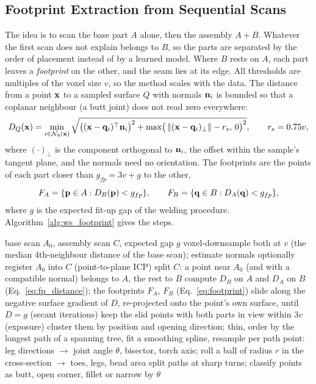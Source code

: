 \subsection{Footprint Extraction from Sequential Scans}
\label{sec:ws_footprint}
The idea is to scan the base part $A$ alone, then the assembly $A+B$. Whatever the first scan
does not explain belongs to $B$, so the parts are separated by the order of placement instead
of by a learned model. Where $B$ rests on $A$, each part leaves a \emph{footprint} on the
other, and the seam lies at its edge. All thresholds are multiples of the voxel size $v$, so
the method scales with the data. The distance from a point $\mathbf{x}$ to a sampled surface
$Q$ with normals $\mathbf{n}_i$ is bounded so that a coplanar neighbour (a butt joint) does not
read zero everywhere:
\begin{equation}
D_Q(\mathbf{x})=\min_{i\in\mathcal{N}_4(\mathbf{x})}\sqrt{\big((\mathbf{x}-\mathbf{q}_i)^{\top}\mathbf{n}_i\big)^2+\max\!\big(\left\lVert(\mathbf{x}-\mathbf{q}_i)_\perp\right\rVert-r_s,\,0\big)^2},\qquad r_s=0.75v,
\label{eq:fp_distance}
\end{equation}
where $(\cdot)_\perp$ is the component orthogonal to $\mathbf{n}_i$, the offset within the sample's
tangent plane, and the normals need no orientation. The footprints are the points of each part
closer than $g_{fp}=3v+g$ to the other,
\begin{equation}
F_A=\{\mathbf{p}\in A: D_B(\mathbf{p})<g_{fp}\},\qquad F_B=\{\mathbf{q}\in B: D_A(\mathbf{q})<g_{fp}\},
\label{eq:footprint}
\end{equation}
where $g$ is the expected fit-up gap of the welding procedure. Algorithm~\ref{alg:ws_footprint}
gives the steps.

\begin{algorithm}[htbp]
\caption{Footprint seam extraction}
\label{alg:ws_footprint}
\begin{algorithmic}[1]
\REQUIRE base scan $A_0$, assembly scan $C$, expected gap $g$
\STATE voxel-downsample both at $v$ (the median 4th-neighbour distance of the base scan); estimate normals
\STATE optionally register $A_0$ into $C$ (point-to-plane ICP)
\STATE split $C$: a point near $A_0$ (and with a compatible normal) belongs to $A$, the rest to $B$
\STATE compute $D_B$ on $A$ and $D_A$ on $B$ (Eq.~\ref{eq:fp_distance}); the footprints $F_A$, $F_B$ (Eq.~\ref{eq:footprint})
  \STATE slide along the negative surface gradient of $D$, re-projected onto the point's own surface, until $D=g$ (secant iterations)
\ENDFOR
\STATE keep the slid points with both parts in view within $3v$ (exposure)
\STATE cluster them by position and opening direction; thin, order by the longest path of a spanning tree, fit a smoothing spline, resample
\STATE per path point: leg directions $\to$ joint angle $\theta$, bisector, torch axis; roll a ball of radius $r$ in the cross-section $\to$ toes, legs, bead area
\STATE split paths at sharp turns; classify points as butt, open corner, fillet or narrow by $\theta$
\end{algorithmic}
\end{algorithm}

